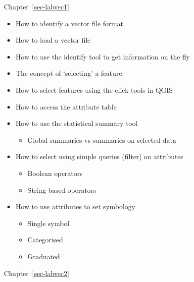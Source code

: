 \documentclass[
  letterpaper,
  DIV=11,
  numbers=noendperiod]{scrreprt}
\providecommand{\tightlist}{%
  \setlength{\itemsep}{0pt}\setlength{\parskip}{0pt}}\usepackage{longtable,booktabs,array}
\begin{document}
Chapter~\ref{sec-labvec1}

\begin{itemize}
\tightlist
\item
  How to identify a vector file format
\item
  How to load a vector file
\item
  How to use the identify tool to get information on the fly
\item
  The concept of `selecting' a feature.
\item
  How to select features using the click tools in QGIS
\item
  How to access the attribute table
\item
  How to use the statistical summary tool

  \begin{itemize}
  \tightlist
  \item
    Global summaries vs summaries on selected data
  \end{itemize}
\item
  How to select using simple queries (filter) on attributes

  \begin{itemize}
  \tightlist
  \item
    Boolean operators
  \item
    String based operators
  \end{itemize}
\item
  How to use attributes to set symbology

  \begin{itemize}
  \tightlist
  \item
    Single symbol
  \item
    Categorised
  \item
    Graduated
  \end{itemize}
\end{itemize}

Chapter~\ref{sec-labvec2}
\end{document}
